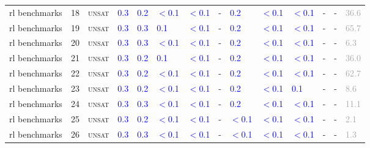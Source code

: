 \begin{center}
{\begin{longtable}{@{}llllllllllllll@{}}
rl benchmarks & 18 & \textsc{unsat} & \textcolor{blue}{0.3} & \textcolor{blue}{0.2} & \textcolor{blue}{$<$0.1} & \textcolor{blue}{$<$0.1} & - & \textcolor{blue}{0.2} & \textcolor{blue}{$<$0.1} & \textcolor{blue}{$<$0.1} & - & - & \textcolor{darkgray}{36.6} \\
rl benchmarks & 19 & \textsc{unsat} & \textcolor{blue}{0.3} & \textcolor{blue}{0.3} & \textcolor{blue}{0.1} & \textcolor{blue}{$<$0.1} & - & \textcolor{blue}{0.2} & \textcolor{blue}{$<$0.1} & \textcolor{blue}{$<$0.1} & - & - & \textcolor{darkgray}{65.7} \\
rl benchmarks & 20 & \textsc{unsat} & \textcolor{blue}{0.3} & \textcolor{blue}{0.3} & \textcolor{blue}{$<$0.1} & \textcolor{blue}{$<$0.1} & - & \textcolor{blue}{0.2} & \textcolor{blue}{$<$0.1} & \textcolor{blue}{$<$0.1} & - & - & \textcolor{darkgray}{6.3} \\
rl benchmarks & 21 & \textsc{unsat} & \textcolor{blue}{0.3} & \textcolor{blue}{0.2} & \textcolor{blue}{0.1} & \textcolor{blue}{$<$0.1} & - & \textcolor{blue}{0.2} & \textcolor{blue}{$<$0.1} & \textcolor{blue}{$<$0.1} & - & - & \textcolor{darkgray}{36.0} \\
rl benchmarks & 22 & \textsc{unsat} & \textcolor{blue}{0.3} & \textcolor{blue}{0.2} & \textcolor{blue}{$<$0.1} & \textcolor{blue}{$<$0.1} & - & \textcolor{blue}{0.2} & \textcolor{blue}{$<$0.1} & \textcolor{blue}{$<$0.1} & - & - & \textcolor{darkgray}{62.7} \\
rl benchmarks & 23 & \textsc{unsat} & \textcolor{blue}{0.3} & \textcolor{blue}{0.2} & \textcolor{blue}{$<$0.1} & \textcolor{blue}{$<$0.1} & - & \textcolor{blue}{0.2} & \textcolor{blue}{$<$0.1} & \textcolor{blue}{0.1} & - & - & \textcolor{darkgray}{8.6} \\
rl benchmarks & 24 & \textsc{unsat} & \textcolor{blue}{0.3} & \textcolor{blue}{0.3} & \textcolor{blue}{$<$0.1} & \textcolor{blue}{$<$0.1} & - & \textcolor{blue}{0.2} & \textcolor{blue}{$<$0.1} & \textcolor{blue}{$<$0.1} & - & - & \textcolor{darkgray}{11.1} \\
rl benchmarks & 25 & \textsc{unsat} & \textcolor{blue}{0.3} & \textcolor{blue}{0.2} & \textcolor{blue}{$<$0.1} & \textcolor{blue}{$<$0.1} & - & \textcolor{blue}{$<$0.1} & \textcolor{blue}{$<$0.1} & \textcolor{blue}{$<$0.1} & - & - & \textcolor{darkgray}{2.1} \\
rl benchmarks & 26 & \textsc{unsat} & \textcolor{blue}{0.3} & \textcolor{blue}{0.3} & \textcolor{blue}{$<$0.1} & \textcolor{blue}{$<$0.1} & - & \textcolor{blue}{$<$0.1} & \textcolor{blue}{$<$0.1} & \textcolor{blue}{$<$0.1} & - & - & \textcolor{darkgray}{1.3} \\

\end{longtable}}
\end{center}
